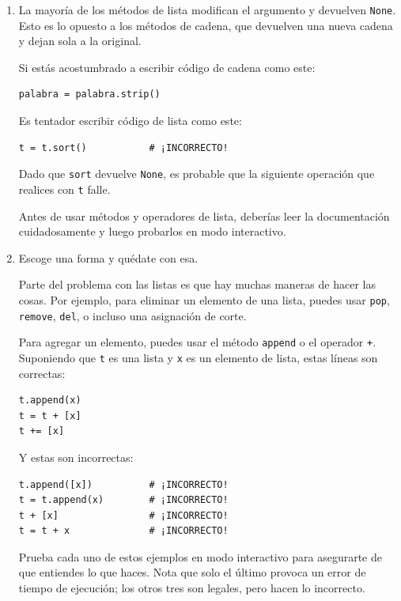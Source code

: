 \documentclass[10pt]{book}
\begin{document}
\begin{enumerate}

\item La mayoría de los métodos de lista modifican el argumento y
  devuelven {\tt None}.  Esto es lo opuesto a los métodos de cadena,
  que devuelven una nueva cadena y dejan sola a la original.

Si estás acostumbrado a escribir código de cadena como este:

\begin{verbatim}
palabra = palabra.strip()
\end{verbatim}

Es tentador escribir código de lista como este:

\begin{verbatim}
t = t.sort()           # ¡INCORRECTO!
\end{verbatim}

Dado que {\tt sort} devuelve {\tt None}, es probable que la
siguiente operación que realices con {\tt t} falle.

Antes de usar métodos y operadores de lista, deberías leer la
documentación cuidadosamente y luego probarlos en modo interactivo.

\item Escoge una forma y quédate con esa.

Parte del problema con las listas es que hay muchas
maneras de hacer las cosas.  Por ejemplo, para eliminar un elemento de
una lista, puedes usar {\tt pop}, {\tt remove}, {\tt del},
o incluso una asignación de corte.

Para agregar un elemento, puedes usar el método {\tt append} o
el operador {\tt +}.  Suponiendo que {\tt t} es una lista y
{\tt x} es un elemento de lista, estas líneas son correctas:

\begin{verbatim}
t.append(x)
t = t + [x]
t += [x]
\end{verbatim}

Y estas son incorrectas:

\begin{verbatim}
t.append([x])          # ¡INCORRECTO!
t = t.append(x)        # ¡INCORRECTO!
t + [x]                # ¡INCORRECTO!
t = t + x              # ¡INCORRECTO!
\end{verbatim}

Prueba cada uno de estos ejemplos en modo interactivo para asegurarte
de que entiendes lo que haces.  Nota que solo el último
provoca un error de tiempo de ejecución; los otros tres son legales, pero
hacen lo incorrecto.



\end{enumerate}
\end{document}

